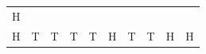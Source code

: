{\begin{tabular}[t]{|l|l|l|l|l|l|l|l|l|l|}
        H%
     \tabularnewline\cline{1-1}\cline{2-2}\cline{3-3}\cline{4-4}\cline{5-5}\cline{6-6}\cline{7-7}\cline{8-8}\cline{9-9}\cline{10-10}
        H &
        T &
        T &
        T &
        T &
        H &
        T &
        T &
        H &
        H%
     \tabularnewline\cline{1-1}\cline{2-2}\cline{3-3}\cline{4-4}\cline{5-5}\cline{6-6}\cline{7-7}\cline{8-8}\cline{9-9}\cline{10-10}

\end{tabular}}

